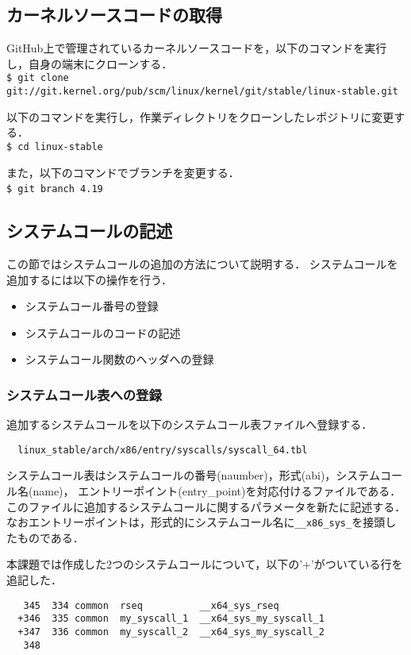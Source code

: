 \documentclass[12pt]{jsarticle}
\begin{document}
\subsection{カーネルソースコードの取得}
GitHub上で管理されているカーネルソースコードを，以下のコマンドを実行し，自身の端末にクローンする．\\
\verb|$ git clone git://git.kernel.org/pub/scm/linux/kernel/git/stable/linux-stable.git|

以下のコマンドを実行し，作業ディレクトリをクローンしたレポジトリに変更する．\\
\verb|$ cd linux-stable|

また，以下のコマンドでブランチを変更する．\\
\verb|$ git branch 4.19|　

\subsection{システムコールの記述}
この節ではシステムコールの追加の方法について説明する．
システムコールを追加するには以下の操作を行う．
\begin{itemize}
  \item システムコール番号の登録  
  \item システムコールのコードの記述
  \item システムコール関数のヘッダへの登録
\end{itemize}


\subsubsection{システムコール表への登録}
追加するシステムコールを以下のシステムコール表ファイルへ登録する．
\begin{verbatim}
  linux_stable/arch/x86/entry/syscalls/syscall_64.tbl
\end{verbatim}

システムコール表はシステムコールの番号(naumber)，形式(abi)，システムコール名(name)，
エントリーポイント(entry\_point)を対応付けるファイルである．
このファイルに追加するシステムコールに関するパラメータを新たに記述する．
なおエントリーポイントは，形式的にシステムコール名に\verb|__x86_sys_|を接頭したものである．

本課題では作成した2つのシステムコールについて，以下の'+'がついている行を追記した．
\begin{verbatim}
   345	334	common	rseq          __x64_sys_rseq
  +346	335	common	my_syscall_1  __x64_sys_my_syscall_1
  +347	336	common	my_syscall_2  __x64_sys_my_syscall_2
   348
\end{verbatim}
\end{document}
